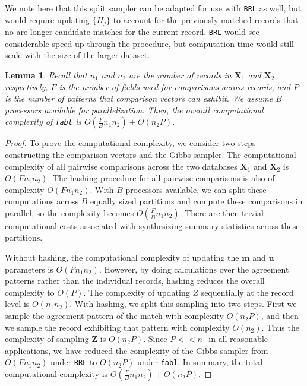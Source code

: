 \documentclass[ba]{imsart}
\newtheorem{lemma}{Lemma}
\begin{document}
	
	\begin{remark}
	We note here that this split sampler can be adapted for use with \texttt{BRL} as well, but would require updating $\{H_j\}$ to account for the previously matched records that no are longer candidate matches for the current record. \texttt{BRL} would see considerable speed up through the procedure, but computation time would still scale with the size of the larger dataset.
	\end{remark}
	
	
	
	\begin{lemma}
		Recall that $n_1$ and $n_2$ are the number of records in $\bm{X}_1$ and $\bm{X}_2$ respectively, $F$ is the number of fields used for comparisons across records, and $P$ is the number of patterns that comparison vectors can exhibit. We assume $B$ processors available for parallelization. Then, the overall computational complexity of \texttt{fabl} is $O(\frac{F}{B} n_1 n_2) + O(n_2 P)$.
		\label{lemma:fabl}
	\end{lemma}
	
	\begin{proof}
		To prove the computational complexity, we consider two steps --- constructing the comparison vectors and the Gibbs sampler. 
		The computational complexity of all pairwise comparisons across the two databases $\bm{X}_1$ and $\bm{X}_2$ is $O(F n_1 n_2)$. The hashing procedure for all pairwise comparisons is also of complexity $O(F n_1 n_2)$. With $B$ processors available, we can split these computations across $B$ equally sized partitions and compute these comparisons in parallel, so the complexity becomes $O(\frac{F}{B} n_1 n_2)$. There are then trivial computational costs associated with synthesizing summary statistics across these partitions. 
		
		Without hashing, the computational complexity of updating the $\bm{m}$ and $\bm{u}$ parameters is $O(F n_1 n_2)$. However, by doing calculations over the agreement patterns rather than the individual records, hashing reduces the overall complexity to $O(P)$. The complexity of updating $Z$ sequentially at the record level is $O(n_1 n_2)$. With hashing, we split this sampling into two steps. First we sample the agreement pattern of the match with complexity $O(n_2 P)$, and then we sample the record exhibiting that pattern with complexity $O(n_2)$. Thus the complexity of sampling $\bm{Z}$ is $O(n_2 P)$. Since $P << n_1$ in all reasonable applications, we have reduced the complexity of the Gibbs sampler from $O(F n_1 n_2)$ under \texttt{BRL} to $O(n_2 P)$ under \texttt{fabl}.
		In summary, the total computational complexity is $O(\frac{F}{B} n_1 n_2) + O(n_2 P).$
	\end{proof} 
	
\end{document}
